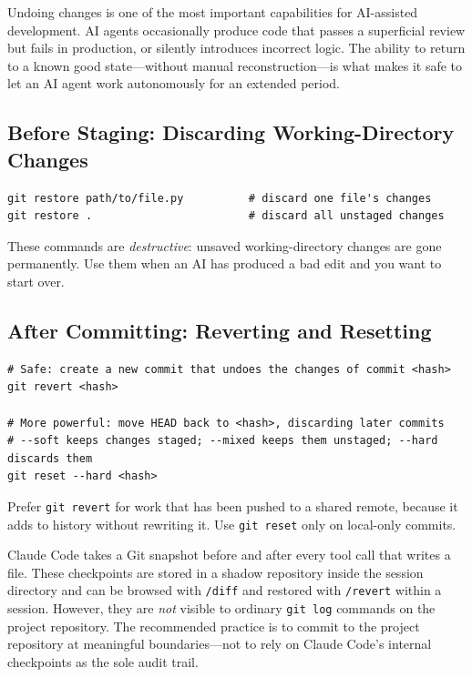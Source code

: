 \begin{context}
Undoing changes is one of the most important capabilities for AI-assisted
development.  AI agents occasionally produce code that passes a superficial
review but fails in production, or silently introduces incorrect logic.  The
ability to return to a known good state---without manual reconstruction---is
what makes it safe to let an AI agent work autonomously for an extended period.
\end{context}

\subsection{Before Staging: Discarding Working-Directory Changes}

\begin{verbatim}
git restore path/to/file.py          # discard one file's changes
git restore .                        # discard all unstaged changes
\end{verbatim}

These commands are \emph{destructive}: unsaved working-directory changes are
gone permanently.  Use them when an AI has produced a bad edit and you want
to start over.

\subsection{After Committing: Reverting and Resetting}

\begin{verbatim}
# Safe: create a new commit that undoes the changes of commit <hash>
git revert <hash>

# More powerful: move HEAD back to <hash>, discarding later commits
# --soft keeps changes staged; --mixed keeps them unstaged; --hard discards them
git reset --hard <hash>
\end{verbatim}

Prefer \texttt{git revert} for work that has been pushed to a shared remote,
because it adds to history without rewriting it.  Use \texttt{git reset} only
on local-only commits.

\begin{remark}
\label{rem:checkpoint-claude}
Claude Code takes a Git snapshot before and after every tool call that writes
a file.  These checkpoints are stored in a shadow repository inside the
session directory and can be browsed with \texttt{/diff} and restored with
\texttt{/revert} within a session.  However, they are \emph{not} visible to
ordinary \texttt{git log} commands on the project repository.  The recommended
practice is to commit to the project repository at meaningful boundaries---not
to rely on Claude Code's internal checkpoints as the sole audit trail.
\end{remark}

